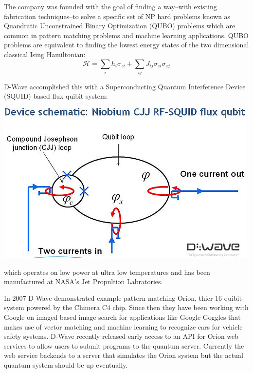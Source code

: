 \documentclass[10pt]{article}
\begin{document}
The company was founded with the goal of finding a way--with existing fabrication techniques--to solve a specific set of NP hard problems known as Quandratic Unconstrained Binary Optimization (QUBO) problems which are common in pattern matching problems and machine learning applications.  QUBO problems are equivalent to finding the lowest energy states of the two dimensional classical Ising Hamiltonian: 
  \[\mathcal{H} = \displaystyle\sum\limits_{i}h_i\sigma_{zi} + \displaystyle\sum\limits_{ij}J_{ij}\sigma_{zi}\sigma_{zj}\]

D-Wave accomplished this with a Superconducting Quantum Interference Device (SQUID) based flux quibit system:
 \begin{center}
  \includegraphics[scale=.7]{../img/Qubit_Schematic}
 \end{center}
which operates on low power at ultra low temperatures and has been manufactured at NASA's Jet Propultion Labratories.  

In 2007 D-Wave demonstrated example pattern matching Orion, thier 16-quibit system powered by the Chimera C4 chip.  Since then they have been working with Google on imaged based image search for applications like Google Goggles that makes use of vector matching and machine learning to recognize cars for vehicle safety systems.  D-Wave recently released early access to an API for Orion web services to allow users to submit programs to the quantum server.  Currently the web service backends to a server that simulates the Orion system but the actual quantum system should be up eventually.
\end{document}
